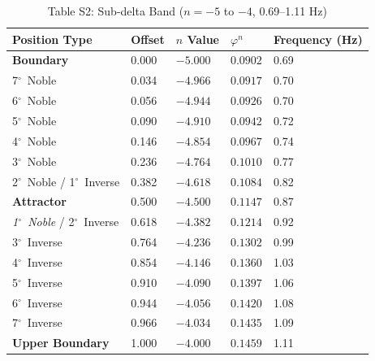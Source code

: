 \documentclass[11pt,a4paper]{article}
\newcommand{\degree}{$^\circ$}  %
\begin{document}
\begin{table}[H]
\centering
\caption*{Table S2: Sub-delta Band ($n = -5$ to $-4$, 0.69--1.11 Hz)}
\begin{tabular}{@{}lllll@{}}
\toprule
Position Type & Offset & $n$ Value & $\varphi^n$ & Frequency (Hz) \\
\midrule
\textbf{Boundary} & 0.000 & $-5.000$ & $0.0902$ & 0.69 \\
7\degree\ Noble & 0.034 & $-4.966$ & $0.0917$ & 0.70 \\
6\degree\ Noble & 0.056 & $-4.944$ & $0.0926$ & 0.70 \\
5\degree\ Noble & 0.090 & $-4.910$ & $0.0942$ & 0.72 \\
4\degree\ Noble & 0.146 & $-4.854$ & $0.0967$ & 0.74 \\
3\degree\ Noble & 0.236 & $-4.764$ & $0.1010$ & 0.77 \\
2\degree\ Noble / 1\degree\ Inverse & 0.382 & $-4.618$ & $0.1084$ & 0.82 \\
\textbf{Attractor} & 0.500 & $-4.500$ & $0.1147$ & 0.87 \\
\textit{1\degree\ Noble} / 2\degree\ Inverse & 0.618 & $-4.382$ & $0.1214$ & 0.92 \\
3\degree\ Inverse & 0.764 & $-4.236$ & $0.1302$ & 0.99 \\
4\degree\ Inverse & 0.854 & $-4.146$ & $0.1360$ & 1.03 \\
5\degree\ Inverse & 0.910 & $-4.090$ & $0.1397$ & 1.06 \\
6\degree\ Inverse & 0.944 & $-4.056$ & $0.1420$ & 1.08 \\
7\degree\ Inverse & 0.966 & $-4.034$ & $0.1435$ & 1.09 \\
\textbf{Upper Boundary} & 1.000 & $-4.000$ & $0.1459$ & 1.11 \\
\bottomrule
\end{tabular}
\end{table}
\end{document}
